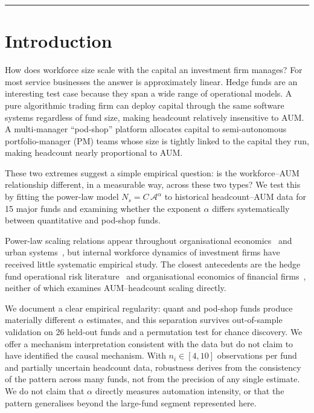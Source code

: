 \documentclass[12pt]{article}
\newcommand{\Ns}{N_{s}}
\newcommand{\Ac}{\mathcal{A}}
\begin{document}
\noindent\rule{\linewidth}{0.4pt}

\section{Introduction}
\label{sec:intro}

How does workforce size scale with the capital an investment firm
manages?
For most service businesses the answer is approximately linear.
Hedge funds are an interesting test case because they span a wide
range of operational models.
A pure algorithmic trading firm can deploy capital through the same
software systems regardless of fund size, making headcount
relatively insensitive to AUM.
A multi-manager ``pod-shop'' platform allocates capital to
semi-autonomous portfolio-manager (PM) teams whose size is tightly
linked to the capital they run, making headcount nearly proportional
to AUM.

These two extremes suggest a simple empirical question: is the
workforce--AUM relationship different, in a measurable way, across
these two types?
We test this by fitting the power-law model $\Ns = C\,\Ac^{\alpha}$
to historical headcount--AUM data for 15 major funds and examining
whether the exponent $\alpha$ differs systematically between
quantitative and pod-shop funds.

Power-law scaling relations appear throughout organisational
economics~\cite{gabaix2009,axtell2001} and urban
systems~\cite{bettencourt2007}, but internal workforce dynamics
of investment firms have received little systematic empirical
study.
The closest antecedents are the hedge fund operational risk
literature~\cite{brown2012} and organisational economics of
financial firms~\cite{philippon2012}, neither of which examines
AUM--headcount scaling directly.

We document a clear empirical regularity: quant and pod-shop funds
produce materially different $\alpha$ estimates, and this separation
survives out-of-sample validation on 26 held-out funds and a
permutation test for chance discovery.
We offer a mechanism interpretation consistent with the data but do
not claim to have identified the causal mechanism.
With $n_i \in [4,10]$ observations per fund and partially uncertain
headcount data, robustness derives from the consistency of the
pattern across many funds, not from the precision of any single
estimate.
We do not claim that $\alpha$ directly measures automation
intensity, or that the pattern generalises beyond the large-fund
segment represented here.
\end{document}
